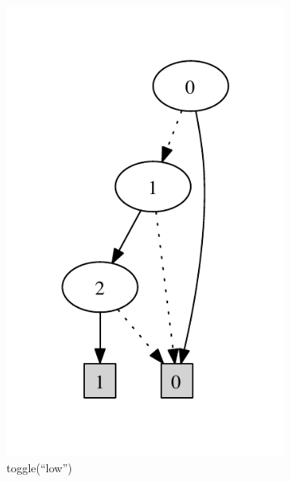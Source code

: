 \begin{figure}
    \centering   
    \begin{subfigure}[b]{0.25\textwidth}
        \includegraphics[width=\textwidth]{figures/bdd1.pdf}
        \caption{toggle(``low'')}
        \label{fig:bdd1}
    \end{subfigure}
    ~ 
    \begin{subfigure}[b]{0.25\textwidth}

\end{subfigure}
\end{figure}
